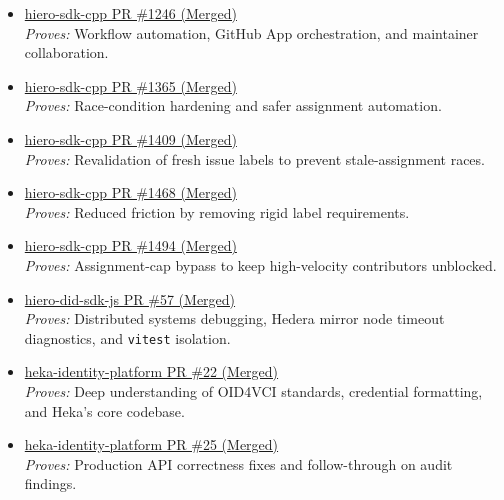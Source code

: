 \documentclass[11pt]{article}
\begin{document}
\begin{itemize}[leftmargin=18pt,itemsep=6pt,topsep=5pt]
    \item \href{https://github.com/hiero-ledger/hiero-sdk-cpp/pull/1246}{hiero-sdk-cpp PR \#1246 (Merged)} \\
    \textit{Proves:} Workflow automation, GitHub App orchestration, and maintainer collaboration.

    \item \href{https://github.com/hiero-ledger/hiero-sdk-cpp/pull/1365}{hiero-sdk-cpp PR \#1365 (Merged)} \\
    \textit{Proves:} Race-condition hardening and safer assignment automation.

    \item \href{https://github.com/hiero-ledger/hiero-sdk-cpp/pull/1409}{hiero-sdk-cpp PR \#1409 (Merged)} \\
    \textit{Proves:} Revalidation of fresh issue labels to prevent stale-assignment races.

    \item \href{https://github.com/hiero-ledger/hiero-sdk-cpp/pull/1468}{hiero-sdk-cpp PR \#1468 (Merged)} \\
    \textit{Proves:} Reduced friction by removing rigid label requirements.

    \item \href{https://github.com/hiero-ledger/hiero-sdk-cpp/pull/1494}{hiero-sdk-cpp PR \#1494 (Merged)} \\
    \textit{Proves:} Assignment-cap bypass to keep high-velocity contributors unblocked.
    
    \item \href{https://github.com/hiero-ledger/hiero-did-sdk-js/pull/57}{hiero-did-sdk-js PR \#57 (Merged)} \\
    \textit{Proves:} Distributed systems debugging, Hedera mirror node timeout diagnostics, and \texttt{vitest} isolation.
    
    \item \href{https://github.com/hiero-ledger/heka-identity-platform/pull/22}{heka-identity-platform PR \#22 (Merged)} \\
    \textit{Proves:} Deep understanding of OID4VCI standards, credential formatting, and Heka's core codebase.
    
    \item \href{https://github.com/hiero-ledger/heka-identity-platform/pull/25}{heka-identity-platform PR \#25 (Merged)} \\
    \textit{Proves:} Production API correctness fixes and follow-through on audit findings.


\end{itemize}
\end{document}
